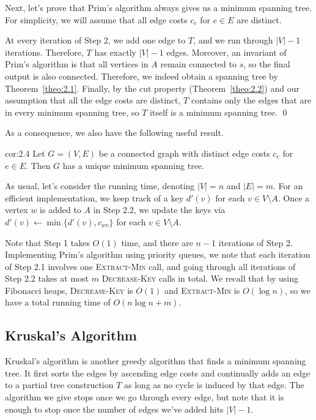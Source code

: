 Next, let's prove that Prim's algorithm always gives us a minimum spanning tree. 
For simplicity, we will assume that all edge costs $c_e$ for 
$e \in E$ are distinct. 

\begin{pf}
    At every iteration of Step 2, we add one edge to $T$, and we run 
    through $|V| - 1$ iterations. Therefore, $T$ has exactly 
    $|V| - 1$ edges. Moreover, an invariant of Prim's algorithm is that 
    all vertices in $A$ remain connected to $s$, so the final output is 
    also connected. Therefore, we indeed obtain a spanning tree by 
    Theorem~\ref{theo:2.1}. Finally, by the cut property (Theorem~\ref{theo:2.2})
    and our assumption that all the edge costs are distinct, $T$ contains 
    only the edges that are in every minimum spanning tree, so $T$ 
    itself is a minimum spanning tree. \qed 
\end{pf}\vspace{-0.25cm}

As a consequence, we also have the following useful result. 

\begin{cor}{cor:2.4}
    Let $G = (V, E)$ be a connected graph with distinct edge costs $c_e$ for 
    $e \in E$. Then $G$ has a unique minimum spanning tree.
\end{cor}\vspace{-0.25cm}

As usual, let's consider the running time, denoting $|V| = n$ 
and $|E| = m$. For an efficient implementation, 
we keep track of a key $d'(v)$ for each $v \in V \setminus A$. 
Once a vertex $w$ is added to $A$ in Step 2.2, we update the keys via 
$d'(v) \gets \min\{d'(v), c_{wv}\}$ for each $v \in V \setminus A$. 

Note that Step 1 takes $O(1)$ time, and 
there are $n-1$ iterations of Step 2. Implementing Prim's algorithm 
using priority queues, we note that each iteration of Step 2.1 
involves one \textsc{Extract-Min} call, and 
going through all iterations of Step 2.2 takes at most $m$ 
\textsc{Decrease-Key} calls in total. We recall that by using Fibonacci heaps, 
\textsc{Decrease-Key} is $O(1)$ and \textsc{Extract-Min} is $O(\log n)$, 
so we have a total running time of $O(n\log n + m)$.

\subsection{Kruskal's Algorithm}\label{subsec:2.4}
Kruskal's algorithm is another greedy algorithm that finds a minimum 
spanning tree. It first sorts the edges by ascending edge costs 
and continually adds an edge to a partial tree construction $T$ as long as no 
cycle is induced by that edge. The algorithm we give stops once we 
go through every edge, but note that it is enough to stop once the 
number of edges we've added hits $|V| - 1$.

